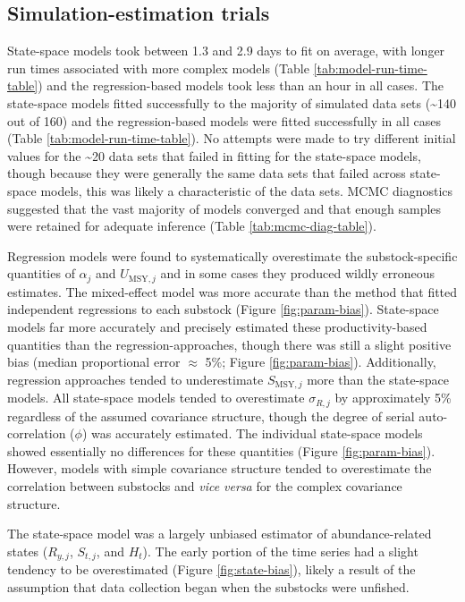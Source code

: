 \documentclass[12pt,]{book}
\theoremstyle{definition}
\theoremstyle{definition}
\theoremstyle{definition}
\theoremstyle{remark}
\begin{document}
\subsection{Simulation-estimation
trials}\label{simulation-estimation-trials-1}

\noindent
State-space models took between 1.3 and 2.9 days to fit on average, with
longer run times associated with more complex models (Table
\ref{tab:model-run-time-table}) and the regression-based models took
less than an hour in all cases. The state-space models fitted
successfully to the majority of simulated data sets
(\textasciitilde{}140 out of 160) and the regression-based models were
fitted successfully in all cases (Table \ref{tab:model-run-time-table}).
No attempts were made to try different initial values for the
\textasciitilde{}20 data sets that failed in fitting for the state-space
models, though because they were generally the same data sets that
failed across state-space models, this was likely a characteristic of
the data sets. MCMC diagnostics suggested that the vast majority of
models converged and that enough samples were retained for adequate
inference (Table \ref{tab:mcmc-diag-table}).

Regression models were found to systematically overestimate the
substock-specific quantities of \(\alpha_j\) and \(U_{\text{MSY},j}\)
and in some cases they produced wildly erroneous estimates. The
mixed-effect model was more accurate than the method that fitted
independent regressions to each substock (Figure \ref{fig:param-bias}).
State-space models far more accurately and precisely estimated these
productivity-based quantities than the regression-approaches, though
there was still a slight positive bias (median proportional error
\(\approx\) 5\%; Figure \ref{fig:param-bias}). Additionally, regression
approaches tended to underestimate \(S_{\text{MSY},j}\) more than the
state-space models. All state-space models tended to overestimate
\(\sigma_{R,j}\) by approximately 5\% regardless of the assumed
covariance structure, though the degree of serial auto-correlation
(\(\phi\)) was accurately estimated. The individual state-space models
showed essentially no differences for these quantities (Figure
\ref{fig:param-bias}). However, models with simple covariance structure
tended to overestimate the correlation between substocks and \emph{vice
versa} for the complex covariance structure.

The state-space model was a largely unbiased estimator of
abundance-related states (\(R_{y,j}\), \(S_{t,j}\), and \(H_t\)). The
early portion of the time series had a slight tendency to be
overestimated (Figure \ref{fig:state-bias}), likely a result of the
assumption that data collection began when the substocks were unfished.
\end{document}
